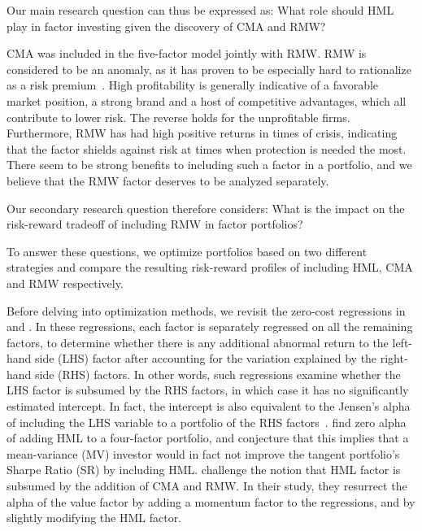 Our main research question can thus be expressed as: What role should HML play in factor investing given the discovery of CMA and RMW?

CMA was included in the five-factor model jointly with RMW. RMW is considered to be an anomaly, as it has proven to be especially hard to rationalize as a risk premium~\autocite{Wang2013}. High profitability is generally indicative of a favorable market position, a strong brand and a host of competitive advantages, which all contribute to lower risk. The reverse holds for the unprofitable firms. Furthermore, RMW has had high positive returns in times of crisis, indicating that the factor shields against risk at times when protection is needed the most. There seem to be strong benefits to including such a factor in a portfolio, and we believe that the RMW factor deserves to be analyzed separately.

Our secondary research question therefore considers: What is the impact on the risk-reward tradeoff of including RMW in factor portfolios? 

To answer these questions, we optimize portfolios based on two different strategies and compare the resulting risk-reward profiles of including HML, CMA and RMW respectively.

Before delving into optimization methods, we revisit the zero-cost regressions in \textcite{FF2015} and \textcite{Asness2015}. In these regressions, each factor is separately regressed on all the remaining factors, to determine whether there is any additional abnormal return to the left-hand side (LHS) factor after accounting for the variation explained by the right-hand side (RHS) factors. In other words, such regressions examine whether the LHS factor is subsumed by the RHS factors, in which case it has no significantly estimated intercept. In fact, the intercept is also equivalent to the Jensen's alpha of including the LHS variable to a portfolio of the RHS factors~\autocite{Jensen1968}. \textcite{FF2015} find zero alpha of adding HML to a four-factor portfolio, and conjecture that this implies that a mean-variance (MV) investor would in fact not improve the tangent portfolio's Sharpe Ratio (SR) by including HML. \textcite{Asness2015} challenge the notion that HML factor is subsumed by the addition of CMA and RMW. In their study, they resurrect the alpha of the value factor by adding a momentum factor to the regressions, and by slightly modifying the HML factor.

